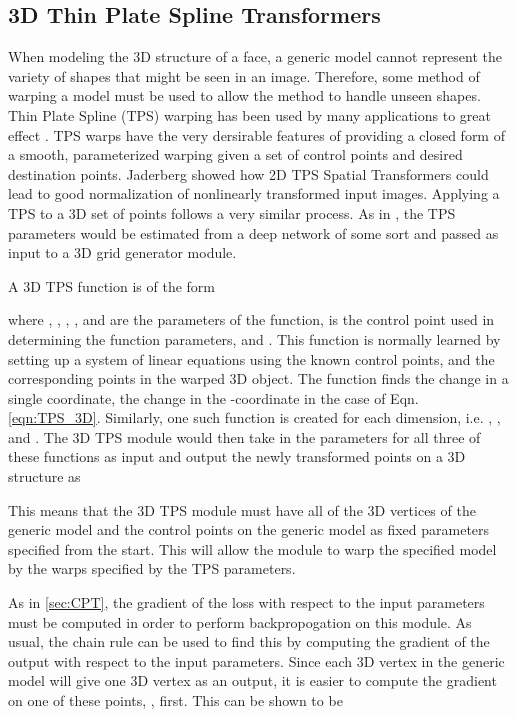 \documentclass[10pt,twocolumn,letterpaper]{article}
\begin{document}
\subsection{3D Thin Plate Spline Transformers}
\label{sec:TPS}
When modeling the 3D structure of a face, a generic model cannot represent the variety of shapes that might be seen in an image. Therefore, some method of warping a model must be used to allow the method to handle unseen shapes. Thin Plate Spline (TPS) warping has been used by many applications to great effect \cite{Bookstein89,Chui03}. TPS warps have the very dersirable features of providing a closed form of a smooth, parameterized warping given a set of control points and desired destination points. Jaderberg \etal \cite{Jaderberg15} showed how 2D TPS Spatial Transformers could lead to good normalization of nonlinearly transformed input images. Applying a TPS to a 3D set of points follows a very similar process. As in \cite{Jaderberg15}, the TPS parameters would be estimated from a deep network of some sort and passed as input to a 3D grid generator module.

A 3D TPS function is of the form

where , , , , and  are the parameters of the function,  is the  control point used in determining the function parameters, and . This function is normally learned by setting up a system of linear equations using the known control points,  and the corresponding points in the warped 3D object. The function finds the change in a single coordinate, the change in the -coordinate in the case of Eqn. \ref{eqn:TPS_3D}. Similarly, one such function is created for each dimension, i.e. , , and . The 3D TPS module would then take in the parameters for all three of these functions as input and output the newly transformed points on a 3D structure as

This means that the 3D TPS module must have all of the 3D vertices of the generic model and the control points on the generic model as fixed parameters specified from the start. This will allow the module to warp the specified model by the warps specified by the TPS parameters.

As in \ref{sec:CPT}, the gradient of the loss with respect to the input parameters must be computed in order to perform backpropogation on this module. As usual, the chain rule can be used to find this by computing the gradient of the output with respect to the input parameters. Since each 3D vertex in the generic model will give one 3D vertex as an output, it is easier to compute the gradient on one of these points, , first. This can be shown to be
\end{document}
